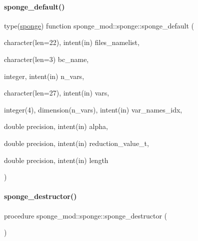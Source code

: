 \mbox{\label{structsponge__mod_1_1sponge_afb942e8b46de1f0ea4de815db78a9c62}} 
\paragraph{\texorpdfstring{sponge\+\_\+default()}{sponge\_default()}}
{\footnotesize\ttfamily type(\mbox{\hyperlink{structsponge__mod_1_1sponge}{sponge}}) function sponge\+\_\+mod\+::sponge\+::sponge\+\_\+default (\begin{DoxyParamCaption}\item[{character(len=22), intent(in)}]{files\+\_\+namelist,  }\item[{character(len=3)}]{bc\+\_\+name,  }\item[{integer, intent(in)}]{n\+\_\+vars,  }\item[{character(len=27), intent(in)}]{vars,  }\item[{integer(4), dimension(n\+\_\+vars), intent(in)}]{var\+\_\+names\+\_\+idx,  }\item[{double precision, intent(in)}]{alpha,  }\item[{double precision, intent(in)}]{reduction\+\_\+value\+\_\+t,  }\item[{double precision, intent(in)}]{length }\end{DoxyParamCaption})\hspace{0.3cm}{\ttfamily [private]}}

\mbox{\label{structsponge__mod_1_1sponge_a592cfa3fa593c79ee6e25dfbe0b22025}} 
\paragraph{\texorpdfstring{sponge\+\_\+destructor()}{sponge\_destructor()}}
{\footnotesize\ttfamily procedure sponge\+\_\+mod\+::sponge\+::sponge\+\_\+destructor (\begin{DoxyParamCaption}{ }\end{DoxyParamCaption})\hspace{0.3cm}{\ttfamily [private]}}

